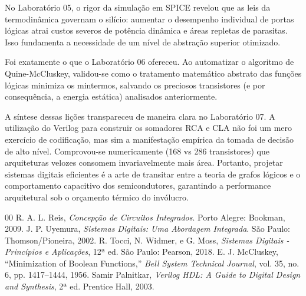 \documentclass[conference]{IEEEtran}
\begin{document}
No Laboratório 05, o rigor da simulação em SPICE revelou que as leis da termodinâmica governam o silício: aumentar o desempenho individual de portas lógicas atrai custos severos de potência dinâmica e áreas repletas de parasitas. Isso fundamenta a necessidade de um nível de abstração superior otimizado.

Foi exatamente o que o Laboratório 06 ofereceu. Ao automatizar o algoritmo de Quine-McCluskey, validou-se como o tratamento matemático abstrato das funções lógicas minimiza os mintermos, salvando os preciosos transistores (e por consequência, a energia estática) analisados anteriormente.

A síntese dessas lições transpareceu de maneira clara no Laboratório 07. A utilização do Verilog para construir os somadores RCA e CLA não foi um mero exercício de codificação, mas sim a manifestação empírica da tomada de decisão de alto nível. Comprovou-se numericamente (168 vs 286 transistores) que arquiteturas velozes consomem invariavelmente mais área. Portanto, projetar sistemas digitais eficientes é a arte de transitar entre a teoria de grafos lógicos e o comportamento capacitivo dos semicondutores, garantindo a performance arquitetural sob o orçamento térmico do invólucro.

\begin{thebibliography}{00}
 R. A. L. Reis, \textit{Concepção de Circuitos Integrados}. Porto Alegre: Bookman, 2009.
 J. P. Uyemura, \textit{Sistemas Digitais: Uma Abordagem Integrada}. São Paulo: Thomson/Pioneira, 2002.
 R. Tocci, N. Widmer, e G. Moss, \textit{Sistemas Digitais - Princípios e Aplicações}, 12ª ed. São Paulo: Pearson, 2018.
 E. J. McCluskey, ``Minimization of Boolean Functions,'' \textit{Bell System Technical Journal}, vol. 35, no. 6, pp. 1417--1444, 1956.
 Samir Palnitkar, \textit{Verilog HDL: A Guide to Digital Design and Synthesis}, 2ª ed. Prentice Hall, 2003.
\end{thebibliography}
\end{document}
